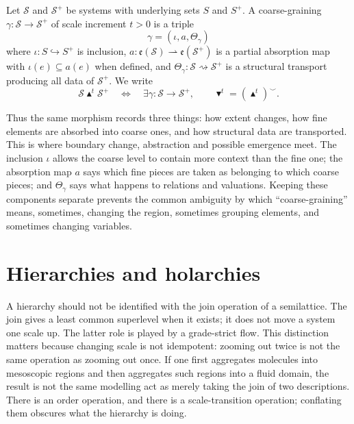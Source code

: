 \documentclass[runningheads]{llncs}
\begin{document}
\begin{definition}\label{def::cg}
Let $\mathcal S$ and $\mathcal S^+$ be systems with underlying sets $S$ and $S^+$. A coarse-graining $\gamma:\mathcal S\to\mathcal S^+$ of scale increment $t>0$ is a triple
\[
\gamma=(\iota,a,\Theta_\gamma)
\]
where $\iota:S\hookrightarrow S^+$ is inclusion, $a:\mathfrak e(\mathcal S)\rightharpoonup\mathfrak e(\mathcal S^+)$ is a partial absorption map with $\iota(e)\subseteq a(e)$ when defined, and $\Theta_\gamma:\mathcal S\rightsquigarrow\mathcal S^+$ is a structural transport producing all data of $\mathcal S^+$. We write
\[
\mathcal S\blacktriangle^t\mathcal S^+ \quad\Longleftrightarrow\quad \exists\gamma:\mathcal S\to\mathcal S^+,
\qquad
\blacktriangledown^t=(\blacktriangle^t)^{\smile}.
\]
\end{definition}

Thus the same morphism records three things: how extent changes, how fine elements are absorbed into coarse ones, and how structural data are transported. This is where boundary change, abstraction and possible emergence meet. The inclusion $\iota$ allows the coarse level to contain more context than the fine one; the absorption map $a$ says which fine pieces are taken as belonging to which coarse pieces; and $\Theta_\gamma$ says what happens to relations and valuations. Keeping these components separate prevents the common ambiguity by which ``coarse-graining'' means, sometimes, changing the region, sometimes grouping elements, and sometimes changing variables.

\section{Hierarchies and holarchies}

A hierarchy should not be identified with the join operation of a semilattice. The join gives a least common superlevel when it exists; it does not move a system one scale up. The latter role is played by a grade-strict flow. This distinction matters because changing scale is not idempotent: zooming out twice is not the same operation as zooming out once. If one first aggregates molecules into mesoscopic regions and then aggregates such regions into a fluid domain, the result is not the same modelling act as merely taking the join of two descriptions. There is an order operation, and there is a scale-transition operation; conflating them obscures what the hierarchy is doing.
\end{document}
